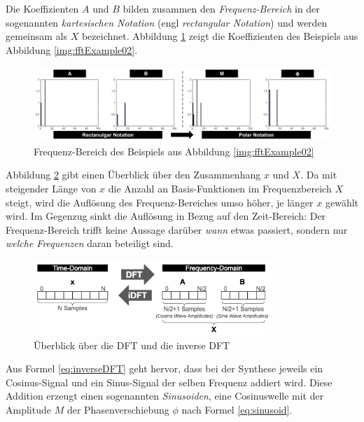 Die Koeffizienten $A$ und $B$ bilden zusammen den \emph{Frequenz-Bereich} in der sogenannten \emph{kartesischen Notation} (engl \emph{rectangular Notation}) und werden gemeinsam als $X$ bezeichnet. \cite[S. 161 - 162]{dspGuide} Abbildung  \ref{img:polarToRect02} zeigt die Koeffizienten des Beispiels aus Abbildung \ref{img:fftExample02}.


\begin{figure}[h]
	\centering
	\includegraphics[width=1\textwidth]{bilder/rectToPolar02.png}
	\caption{Frequenz-Bereich des Beispiels aus Abbildung \ref{img:fftExample02}}
	\label{img:polarToRect02}
\end{figure}

Abbildung \ref{img:dtOverview} gibt einen Überblick über den Zusammenhang $x$ und $X$. Da mit steigender Länge von $x$ die Anzahl an Basis-Funktionen im Frequenzbereich $X$ steigt, wird die Auflösung des Frequenz-Bereiches umso höher, je länger $x$ gewählt wird. Im Gegenzug sinkt die Auflösung in Bezug auf den Zeit-Bereich: Der Frequenz-Bereich trifft keine Aussage darüber \emph{wann} etwas passiert, sondern nur \emph{welche Frequenzen} daran beteiligt sind.\cite[S. 170]{dspGuide}

\begin{figure}[h]
	\centering
	\includegraphics[width=0.8\textwidth]{bilder/dftOverview.png}
	\caption{Überblick über die DFT und die inverse DFT}
	\label{img:dtOverview}
\end{figure}


Aus Formel \ref{eq:inverseDFT} geht hervor, dass bei der Synthese jeweils ein Cosinus-Signal und ein Sinus-Signal der selben Frequenz addiert wird. Diese Addition erzeugt einen sogenannten \emph{Sinusoiden}, eine Cosinuswelle mit der Amplitude $M$ der Phasenverschiebung $\phi$ nach Formel \ref{eq:sinusoid}.\cite[S. 162]{dspGuide}

